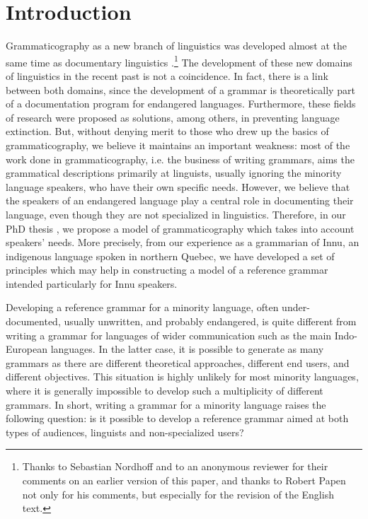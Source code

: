 \section{Introduction}
Grammaticography as a new branch of linguistics was developed almost at the same time as documentary linguistics \citep{GippertEtAlEd2006}.\footnote{Thanks 
 to Sebastian Nordhoff and to an anonymous reviewer for their comments on an earlier version of this paper, and thanks to Robert Papen not only for his comments, but especially for the revision of the English text.
}  The development of these new domains of linguistics in the recent past is not a coincidence. In fact, there is a link between both domains, since the development of a grammar is theoretically part of a documentation program for endangered languages. Furthermore, these fields of research were proposed as solutions, among others, in preventing language extinction. But, without denying merit to those who drew up the basics of grammaticography, we believe it maintains an important weakness: most of the work done in grammaticography, i.e. the business of writing grammars, aims the grammatical descriptions primarily at linguists, usually ignoring the minority language speakers, who have their own specific needs. However, we believe that the speakers of an endangered language play a central role in documenting their language, even though they are not specialized in linguistics. Therefore, in our PhD thesis  \citep{Baraby2011a}, we propose a model of grammaticography which takes into account speakers' needs. More precisely, from our experience as a grammarian of Innu, an indigenous language spoken in northern Quebec, we have developed a set of principles which may help in constructing a model of a reference grammar intended particularly for Innu speakers.

Developing a reference grammar for a minority language, often under-documented, usually unwritten, and probably endangered, is quite different from writing a grammar for languages of wider communication such as the main Indo-European languages. In the latter case, it is possible to generate as many grammars as there are different theoretical approaches, different end users, and different objectives. This situation is highly unlikely for most minority languages, where it is generally impossible to develop such a multiplicity of different grammars. In short, writing a grammar for a minority language raises the following question: is it possible to develop a reference grammar aimed at both types of audiences, linguists and non-specialized users?


